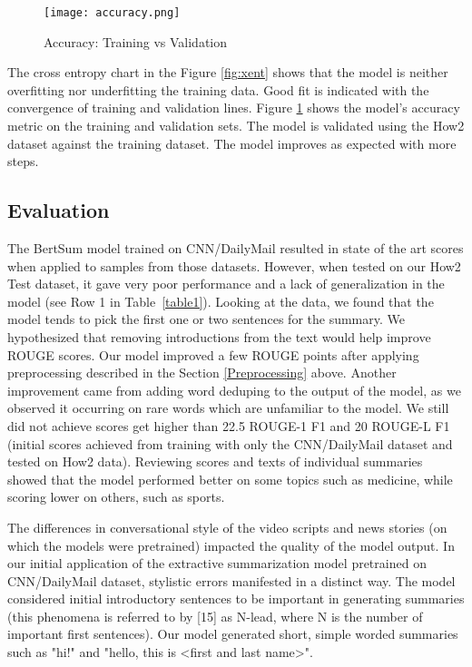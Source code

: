\documentclass[sigconf]{acmart}
\begin{document}
\begin{figure} 
  \centering
  \texttt{[image: accuracy.png]}
  \caption{Accuracy: Training vs Validation}
  \label{fig:accuracy}
\end{figure} 

The cross entropy chart  in the Figure \ref{fig:xent} shows that the model is neither overfitting nor underfitting the training data. Good fit is indicated with the convergence of training and validation lines. Figure \ref{fig:accuracy} shows the model’s accuracy metric on the training and validation sets. The model is validated using the How2 dataset against the training dataset. The model improves as expected with more steps.

\subsection{Evaluation}

The BertSum model trained on CNN/DailyMail \cite{liu-lapata-2019-text}  resulted in state of the art scores when applied to samples from those datasets. However, when tested on our How2 Test dataset, it gave very poor performance and a lack of generalization in the model (see Row 1 in Table~\ref{table1}). Looking at the data, we found that the model tends to pick the first one or two sentences for the summary.  We hypothesized that removing introductions from the text would help improve ROUGE scores. Our model improved a few ROUGE points after applying  preprocessing described in the Section \ref{Preprocessing} above. Another improvement came from adding word deduping to the output of the model, as we observed it occurring on rare words which are unfamiliar to the model. We still did not achieve scores get higher than 22.5 ROUGE-1 F1 and 20 ROUGE-L F1 (initial scores achieved from training with only the CNN/DailyMail dataset and tested on How2 data). Reviewing scores and texts of individual summaries showed that the model performed better on some topics such as medicine, while scoring lower on others, such as sports. 

The differences in conversational style of the video scripts and news stories (on which the models were pretrained) impacted the quality of the model output. In our initial application of the extractive summarization model pretrained on CNN/DailyMail dataset, stylistic errors manifested in a distinct way. The model considered initial introductory sentences to be important in generating summaries (this phenomena is referred to by [15] as N-lead, where N is the number of important first sentences). Our model generated short, simple worded summaries such as "hi!" and "hello, this is <first and last name>".
\end{document}
